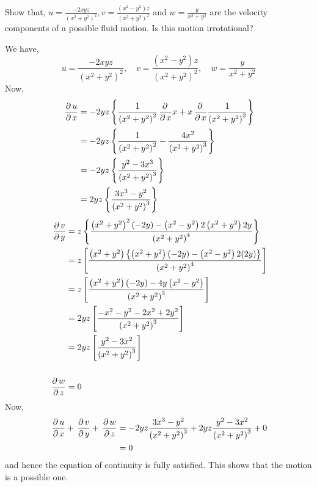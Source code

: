 \documentclass[12pt]{article}
\begin{document}
\newpage
\begin{prob}
    Show that, $ u=\frac{-2xyz}{\left( x^2+y^2 \right)^2}, v=\frac{\left( x^2-y^2  \right)z}{\left( x^2+y^2 \right)^2} $ and $ w=\frac{y}{x^2+y^2} $ are the velocity components of a possible fluid motion. Is this motion irrotational?
\end{prob}
\begin{soln}
    We have,
    \[
        u=\frac{-2xyz}{\left( x^2+y^2 \right)^2},\quad v=\frac{\left( x^2-y^2  \right)z}{\left( x^2+y^2 \right)^2},\quad w=\frac{y}{x^2+y^2}
    \]
    Now,
    \begin{align*}
        \,\frac{\partial\, u}{\partial\, x}&=-2yz\left\{ \frac{1}{\left( x^2+y^2 \right)^2}\,\frac{\partial\, }{\partial\, x}x+x\,\frac{\partial\, }{\partial\, x}\frac{1}{\left( x^2+y^2 \right)^2} \right\}\\
        &=-2yz\left\{ \frac{1}{\left( x^2+y^2 \right)^2}-\frac{4x^2}{\left( x^2+y^2 \right)^3} \right\}\\
        &=-2yz\left\{ \frac{y^2-3x^3}{\left( x^2+y^2 \right)^3}\right\}\\
        &=2yz\left\{ \frac{3x^3-y^2}{\left( x^2+y^2 \right)^3}\right\}
    \end{align*}
    \begin{align*}
        \,\frac{\partial\, v}{\partial\, y}&=z\left\{ \frac{\left( x^2+y^2 \right)^2\left( -2y    \right)-\left( x^2-y^2 \right)2\left( x^2+y^2 \right)2y}{\left( x^2+y^2 \right)^4} \right\}\\
        &=z\left[ \frac{\left( x^2+y^2 \right)\left\{\left( x^2+y^2 \right)\left( -2y\right)-\left( x^2-y^2 \right)2(2y)\right\}}{\left( x^2+y^2 \right)^4} \right]\\
        &=z\left[ \frac{\left( x^2+y^2 \right)\left( -2y\right)-4y\left( x^2-y^2 \right)}{\left( x^2+y^2 \right)^3} \right]\\
        &=2yz\left[ \frac{ -x^2-y^2-2x^2+2y^2}{\left( x^2+y^2 \right)^3} \right]\\
        &=2yz\left[ \frac{y^2-3x^2}{\left( x^2+y^2 \right)^3} \right]\\
        &\\
        \,\frac{\partial\, w}{\partial\, z}&=0
    \end{align*}
    Now,
    \begin{align*}
        \,\frac{\partial\, u}{\partial\, x}+\,\frac{\partial\, v}{\partial\, y}+\,\frac{\partial\, w}{\partial\, z}&=-2yz\frac{3x^3-y^2}{\left( x^2+y^2 \right)^3}+2yz\frac{y^2-3x^2}{\left( x^2+y^2 \right)^3}+0\\
        &=0
    \end{align*}
    and hence the equation of continuity is fully satisfied. This shows that the motion is a possible one.\\

\end{soln}
\end{document}
